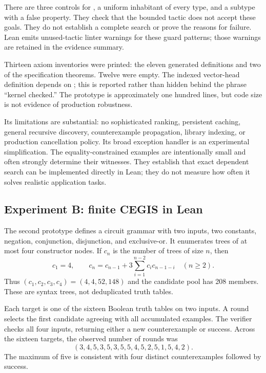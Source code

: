 \documentclass[11pt,letterpaper]{article}
\newcommand{\code}[1]{\texttt{\detokenize{#1}}}
\theoremstyle{definition}
\theoremstyle{remark}
\begin{document}
There are three \code{fail_if_success} controls for \code{False}, a uniform inhabitant of every type, and a subtype with a false property. They check that the bounded tactic does not accept these goals. They do not establish a complete search or prove the reasons for failure. Lean emits unused-tactic linter warnings for these guard patterns; those warnings are retained in the evidence summary.

Thirteen axiom inventories were printed: the eleven generated definitions and two of the specification theorems. Twelve were empty. The indexed vector-head definition depends on \code{propext}; this is reported rather than hidden behind the phrase ``kernel checked.'' The prototype is approximately one hundred lines, but code size is not evidence of production robustness.

Its limitations are substantial: no sophisticated ranking, persistent caching, general recursive discovery, counterexample propagation, library indexing, or production cancellation policy. Its broad exception handler is an experimental simplification. The equality-constrained examples are intentionally small and often strongly determine their witnesses. They establish that exact dependent search can be implemented directly in Lean; they do not measure how often it solves realistic application tasks.

\subsection{Experiment B: finite CEGIS in Lean}

The second prototype defines a circuit grammar with two inputs, two constants, negation, conjunction, disjunction, and exclusive-or. It enumerates trees of at most four constructor nodes. If $c_n$ is the number of trees of size $n$, then
\[
 c_1=4,\qquad
 c_n=c_{n-1}+3\sum_{i=1}^{n-2}c_i c_{n-1-i}\quad(n\ge2).
\]
Thus $(c_1,c_2,c_3,c_4)=(4,4,52,148)$ and the candidate pool has 208 members. These are syntax trees, not deduplicated truth tables.

Each target is one of the sixteen Boolean truth tables on two inputs. A round selects the first candidate agreeing with all accumulated examples. The verifier checks all four inputs, returning either a new counterexample or success. Across the sixteen targets, the observed number of rounds was
\[
 (3,4,5,3,5,3,5,5,4,5,2,5,1,5,4,2).
\]
The maximum of five is consistent with four distinct counterexamples followed by success.
\end{document}
